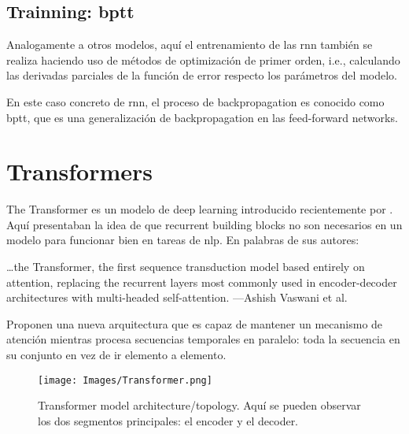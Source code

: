 \subsection{Trainning: \acl*{bptt}}

Analogamente a otros modelos, aquí el entrenamiento de las \gls{rnn} también se
realiza haciendo uso de métodos de optimización de primer orden, i.e.,
calculando las derivadas parciales de la función de error respecto los
parámetros del modelo.

En este caso concreto de \gls{rnn}, el proceso de backpropagation es conocido
como \gls{bptt}, que es una generalización de backpropagation en las
feed-forward networks.


\section{Transformers} \label{sec:transformers}

The Transformer es un modelo de deep learning introducido recientemente por
. Aquí presentaban la idea de que
recurrent building blocks no son necesarios en un modelo para funcionar bien en
tareas de \gls{nlp}. En palabras de sus autores:

\begin{quoteBox}
  \ldots the Transformer, the first sequence transduction model based entirely
  on attention, replacing the recurrent layers most commonly used in
  encoder-decoder architectures with multi-headed self-attention.
  \tcblower
  ---Ashish Vaswani et al.
\end{quoteBox}

Proponen una nueva arquitectura que es capaz de mantener un mecanismo de
atención mientras procesa secuencias temporales en paralelo: toda la secuencia
en su conjunto en vez de ir elemento a elemento.

\begin{figure}[p]
  \centering
  \texttt{[image: Images/Transformer.png]}
  \caption[Transformer model architecture]{Transformer model
    architecture/topology. Aquí se pueden observar los dos segmentos
    principales: el encoder y el decoder.}
  \label{fig:transformer}
\end{figure}

